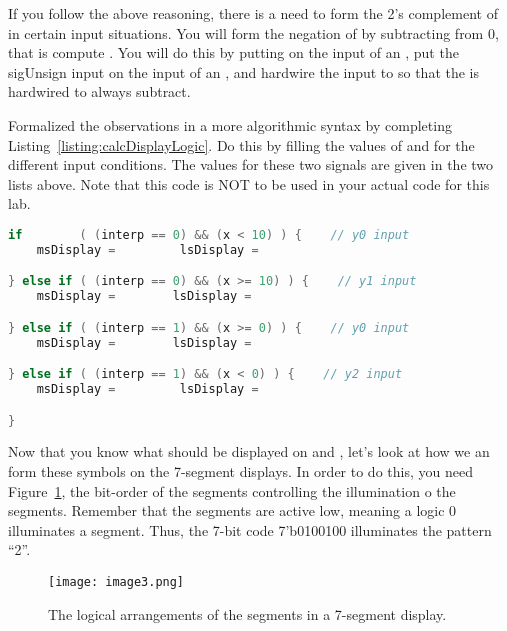     If you follow the above reasoning, there is a need to form the 2's complement of  in certain input
    situations.  You will form the
    negation of  by subtracting  from 0, that is compute .  You will do this by
    putting  on the  input
    of an , put the sigUnsign input  on the  input of an , and hardwire
    the  input to  so that the
     is hardwired to always subtract.

    Formalized the observations in a more algorithmic syntax by completing Listing~\ref{listing:calcDisplayLogic}.
    Do this by filling the values of  and  for the different input conditions.  The
    values for these two signals are given in the two lists above.  Note that this code is NOT to be used in your
    actual code for this lab.

    \pagebreak

\begin{lstlisting}[language=Verilog,
 caption={Logic that determines the output of the 4:1 muxes in Figure~\ref{fig:calcSigUnSigArch}.},
 label={listing:calcDisplayLogic},
 frame=single]
if        ( (interp == 0) && (x < 10) ) {    // y0 input
    msDisplay =         lsDisplay =

} else if ( (interp == 0) && (x >= 10) ) {    // y1 input
    msDisplay =        lsDisplay =

} else if ( (interp == 1) && (x >= 0) ) {    // y0 input
    msDisplay =        lsDisplay =

} else if ( (interp == 1) && (x < 0) ) {    // y2 input
    msDisplay =         lsDisplay =

}
\end{lstlisting}

    Now that you know what should be displayed on  
    and , let's look at how we an form these symbols on the
    7-segment displays.  In order to do this, you need Figure~\ref{fig:calcSevenSeg},
    the bit-order of the segments controlling the illumination o the segments. Remember
    that the segments are active low, meaning a logic 0 illuminates a
    segment. Thus, the 7-bit code 7'b0100100 illuminates the pattern ``2''.

    \begin{figure}[ht]
        \texttt{[image:  image3.png]}
        \caption{The logical arrangements of the segments in a 7-segment display.}
        \label{fig:calcSevenSeg}
    \end{figure}


